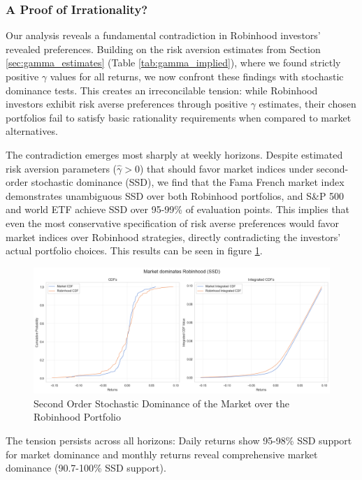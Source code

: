 \subsubsection{A Proof of Irrationality?}
Our analysis reveals a fundamental contradiction in Robinhood investors' revealed preferences. 
Building on the risk aversion estimates from Section \ref{sec:gamma_estimates} (Table \ref{tab:gamma_implied}), where we found strictly positive $\gamma$ values for all returns, we now confront these findings with stochastic dominance tests. 
This creates an irreconcilable tension: while Robinhood investors exhibit risk averse preferences through positive $\gamma$ estimates, their chosen portfolios fail to satisfy basic rationality requirements when compared to market alternatives.

The contradiction emerges most sharply at weekly horizons. 
Despite estimated risk aversion parameters ($\hat{\gamma} > 0$) that should favor market indices under second-order stochastic dominance (SSD), we find that the Fama French market index demonstrates unambiguous SSD over both Robinhood portfolios, 
and S\&P 500 and world ETF  achieve SSD over 95-99\% of evaluation points.
This implies that even the most conservative specification of risk averse preferences would favor market indices over Robinhood strategies, directly contradicting the investors' actual portfolio choices.
This results can be seen in figure \ref{fig:ssd_market_rh}. 
\begin{figure}[H]
    \centering
    \includegraphics[width=\linewidth]{../images/risk/ssd_number_5d_mkt.png}
    \caption{Second Order Stochastic Dominance of the Market over the Robinhood Portfolio}
\label{fig:ssd_market_rh}
\end{figure}    

The tension persists across all horizons: Daily returns show 95-98\% SSD support for market dominance and monthly returns reveal comprehensive market dominance (90.7-100\% SSD support).


